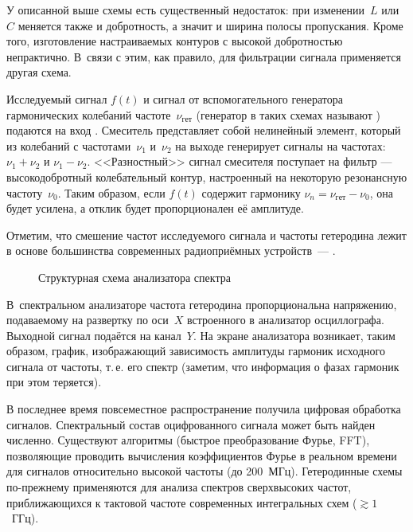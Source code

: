 \experiment

У описанной выше схемы есть существенный недостаток: при изменении~$L$ или~$C$
меняется также и добротность, а значит и ширина полосы пропускания.
Кроме того, изготовление настраиваемых контуров с высокой добротностью
непрактично. В~связи с этим, как правило, для фильтрации сигнала
применяется другая схема.

Исследуемый сигнал $f(t)$ и сигнал от вспомогательного генератора гармонических
колебаний частоте~$\nu_{гет}$ (генератор в таких схемах называют
) подаются на вход . Смеситель
представляет собой нелинейный элемент, который из колебаний с частотами~$\nu_1$
и~$\nu_2$ на выходе генерирует сигналы на 
частотах: $\nu_1 + \nu_2$ и $\nu_1 - \nu_2$.
<<Разностный>> сигнал смесителя поступает на фильтр ---
высокодобротный колебательный контур, настроенный на некоторую 
резонансную частоту~$\nu_0$. Таким образом, если $f(t)$ содержит гармонику
$\nu_n=\nu_{гет}-\nu_0$, она будет усилена, а отклик будет
пропорционален её амплитуде.

Отметим, что смешение частот исследуемого сигнала и частоты гетеродина лежит в
основе большинства современных радиоприёмных устройств~---
.

\begin{figure}[h!]
\hfil
{}
\caption{Структурная схема анализатора спектра}
\end{figure}

В~спектральном анализаторе частота гетеродина пропорциональна напряжению,
подаваемому на развертку по оси~$X$ встроенного в анализатор осциллографа.
Выходной сигнал подаётся на канал~$Y$. На экране анализатора возникает, таким
образом, график, изображающий зависимость амплитуды гармоник исходного сигнала
от частоты, т.\,е. его спектр (заметим, что информация о фазах гармоник при этом
теряется).

В последнее время повсеместное распространение получила цифровая обработка
сигналов. Спектральный состав оцифрованного сигнала может быть найден численно.
Существуют алгоритмы (быстрое преобразование Фурье, FFT), позволяющие проводить
вычисления коэффициентов Фурье в реальном времени для сигналов относительно
высокой частоты (до 200~МГц). Гетеродинные схемы по-прежнему
применяются для анализа спектров сверхвысоких частот, приближающихся
к тактовой частоте современных интегральных схем ($\gtrsim1$~ГГц).

